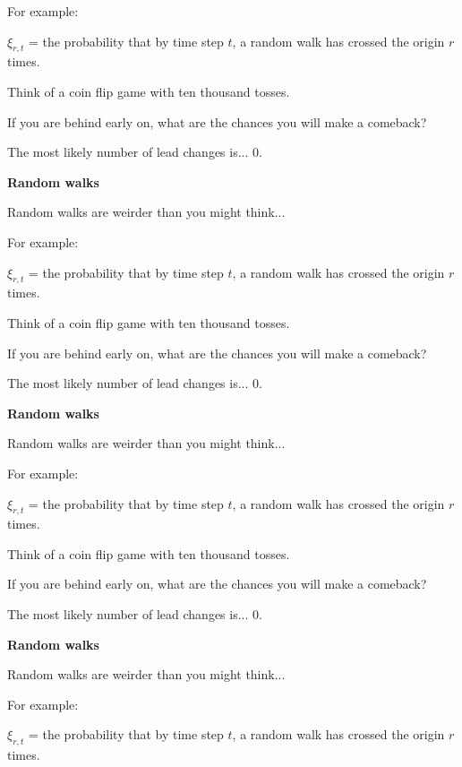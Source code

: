   For example:

  $\xi_{r,t}$ = the probability that by time step $t$,
  a random walk has crossed the origin $r$ times.

  Think of a coin flip game with ten thousand tosses.

  If you are behind early on, what are the chances you
  will make a comeback?

  The most likely number of lead changes is...  
  0.



  \textbf{Random walks}

  Random walks are weirder than you might think...

  For example:

  $\xi_{r,t}$ = the probability that by time step $t$,
  a random walk has crossed the origin $r$ times.

  \inv

  Think of a coin flip game with ten thousand tosses.

  If you are behind early on, what are the chances you
  will make a comeback?

  The most likely number of lead changes is...  
  0.




  \textbf{Random walks}

  Random walks are weirder than you might think...

  For example:

  $\xi_{r,t}$ = the probability that by time step $t$,
  a random walk has crossed the origin $r$ times.

  Think of a coin flip game with ten thousand tosses.

  If you are behind early on, what are the chances you
  will make a comeback?

  \inv 

  The most likely number of lead changes is...  
  0.



  \textbf{Random walks}

  Random walks are weirder than you might think...

  For example:

  $\xi_{r,t}$ = the probability that by time step $t$,
  a random walk has crossed the origin $r$ times.

